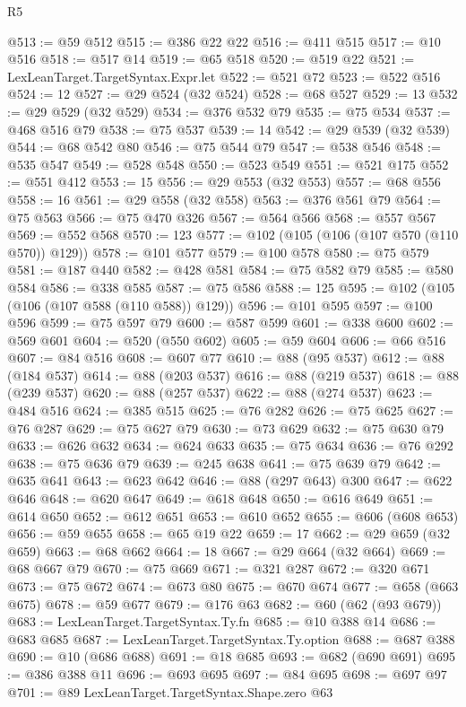 \begin{lexlean}{R5}
\begin{coremodule}
@513 := @59 @512
@515 := @386 @22 @22
@516 := @411 @515
@517 := @10 @516
@518 := @517 @14
@519 := @65 @518
@520 := @519 @22
@521 := LexLeanTarget.TargetSyntax.Expr.let
@522 := @521 @72
@523 := @522 @516
@524 := 12
@527 := @29 @524 (@32 @524)
@528 := @68 @527
@529 := 13
@532 := @29 @529 (@32 @529)
@534 := @376 @532 @79
@535 := @75 @534
@537 := @468 @516 @79
@538 := @75 @537
@539 := 14
@542 := @29 @539 (@32 @539)
@544 := @68 @542 @80
@546 := @75 @544 @79
@547 := @538 @546
@548 := @535 @547
@549 := @528 @548
@550 := @523 @549
@551 := @521 @175
@552 := @551 @412
@553 := 15
@556 := @29 @553 (@32 @553)
@557 := @68 @556
@558 := 16
@561 := @29 @558 (@32 @558)
@563 := @376 @561 @79
@564 := @75 @563
@566 := @75 @470 @326
@567 := @564 @566
@568 := @557 @567
@569 := @552 @568
@570 := 123
@577 := @102 (@105 (@106 (@107 @570 (@110 @570)) @129))
@578 := @101 @577
@579 := @100 @578
@580 := @75 @579
@581 := @187 @440
@582 := @428 @581
@584 := @75 @582 @79
@585 := @580 @584
@586 := @338 @585
@587 := @75 @586
@588 := 125
@595 := @102 (@105 (@106 (@107 @588 (@110 @588)) @129))
@596 := @101 @595
@597 := @100 @596
@599 := @75 @597 @79
@600 := @587 @599
@601 := @338 @600
@602 := @569 @601
@604 := @520 (@550 @602)
@605 := @59 @604
@606 := @66 @516
@607 := @84 @516
@608 := @607 @77
@610 := @88 (@95 @537)
@612 := @88 (@184 @537)
@614 := @88 (@203 @537)
@616 := @88 (@219 @537)
@618 := @88 (@239 @537)
@620 := @88 (@257 @537)
@622 := @88 (@274 @537)
@623 := @484 @516
@624 := @385 @515
@625 := @76 @282
@626 := @75 @625
@627 := @76 @287
@629 := @75 @627 @79
@630 := @73 @629
@632 := @75 @630 @79
@633 := @626 @632
@634 := @624 @633
@635 := @75 @634
@636 := @76 @292
@638 := @75 @636 @79
@639 := @245 @638
@641 := @75 @639 @79
@642 := @635 @641
@643 := @623 @642
@646 := @88 (@297 @643) @300
@647 := @622 @646
@648 := @620 @647
@649 := @618 @648
@650 := @616 @649
@651 := @614 @650
@652 := @612 @651
@653 := @610 @652
@655 := @606 (@608 @653)
@656 := @59 @655
@658 := @65 @19 @22
@659 := 17
@662 := @29 @659 (@32 @659)
@663 := @68 @662
@664 := 18
@667 := @29 @664 (@32 @664)
@669 := @68 @667 @79
@670 := @75 @669
@671 := @321 @287
@672 := @320 @671
@673 := @75 @672
@674 := @673 @80
@675 := @670 @674
@677 := @658 (@663 @675)
@678 := @59 @677
@679 := @176 @63
@682 := @60 (@62 (@93 @679))
@683 := LexLeanTarget.TargetSyntax.Ty.fn
@685 := @10 @388 @14
@686 := @683 @685
@687 := LexLeanTarget.TargetSyntax.Ty.option
@688 := @687 @388
@690 := @10 (@686 @688)
@691 := @18 @685
@693 := @682 (@690 @691)
@695 := @386 @388 @11
@696 := @693 @695
@697 := @84 @695
@698 := @697 @97
@701 := @89 LexLeanTarget.TargetSyntax.Shape.zero @63

\end{coremodule}
\end{lexlean}
